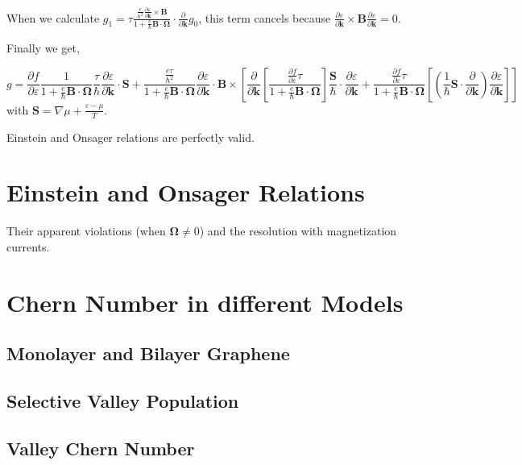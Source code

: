 \documentclass[aps,amsmath,prl]{revtex4-2}
\newcommand{\bvec}[1]{{\mathbf #1}}
\begin{document}
When we calculate $g_1 = \tau \frac{\frac{e}{\hbar^2} \frac{\partial \varepsilon}{\partial \bvec{k}} \times \bvec{B}}{1 + \frac{e}{\hbar} \bvec{B}\cdot\bvec{\Omega}} \cdot\frac{\partial}{\partial \bvec{k}} g_0$, this term cancels because $\frac{\partial \varepsilon}{\partial \bvec{k}} \times \bvec{B}  \frac{\partial \varepsilon}{\partial \bvec{k}} = 0$.

Finally we get,

\begin{equation}
g = \frac{\partial f} {\partial \varepsilon}\frac{1}{1 + \frac{e}{\hbar} \bvec{B}\cdot\bvec{\Omega}}
\frac{\tau}{\hbar} \frac{\partial \varepsilon}{\partial \bvec{k}}\cdot  \bvec{S} + \frac{\frac{e \tau}{\hbar^2} }{1 + \frac{e}{\hbar} \bvec{B}\cdot\bvec{\Omega}} \frac{\partial \varepsilon}{\partial \bvec{k}} \cdot \bvec{B} \times \left[ \frac{\partial}{\partial \bvec{k}} \left[ \frac{\frac{\partial f} {\partial \varepsilon} \tau}{1 + \frac{e}{\hbar} \bvec{B}\cdot\bvec{\Omega}}
\right] \frac{\bvec{S}}{\hbar} \cdot \frac{\partial \varepsilon}{\partial \bvec{k}} + \frac{\frac{\partial f} {\partial \varepsilon} \tau}{1 + \frac{e}{\hbar} \bvec{B}\cdot\bvec{\Omega}} \left[(\frac{1}{\hbar} \bvec{S}\cdot \frac{\partial }{\partial \bvec{k}} )\frac{\partial \varepsilon}{\partial \bvec{k}} \right] \right]
\end{equation}\label{Eq:g_non_zero_chem_temp_grad}
with $\bvec{S} = \nabla \mu + \frac{\varepsilon - \mu}{T}$.

Einstein and Onsager relations are perfectly valid.

\section{Einstein and Onsager Relations}
Their apparent violations (when $\bvec{\Omega} \neq 0$) and the resolution with magnetization currents.

\section{Chern Number in different Models}
\subsection{Monolayer and Bilayer Graphene}
\subsection{Selective Valley Population}
\subsection{Valley Chern Number}
\end{document}
